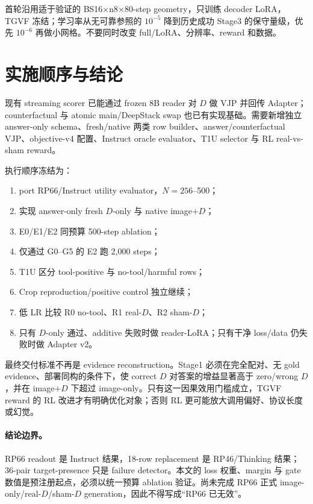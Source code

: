 \documentclass[UTF8,twocolumn,10pt,a4paper]{ctexart}
\begin{document}
首轮沿用适于验证的 BS16$\times$n8$\times$80-step geometry，只训练 decoder LoRA，TGVF 冻结；学习率从无可靠参照的 $10^{-5}$ 降到历史成功 Stage3 的保守量级，优先 $10^{-6}$ 再做小网格。不要同时改变 full/LoRA、分辨率、reward 和数据。

\section{实施顺序与结论}

现有 streaming scorer 已能通过 frozen 8B reader 对 $D$ 做 VJP 并回传 Adapter；counterfactual 与 atomic main/DeepStack swap 也已有实现基础。需要新增独立 answer-only schema、fresh/native 两类 row builder、answer/counterfactual VJP、objective-v4 配置、Instruct oracle evaluator、T1U selector 与 RL real-vs-sham reward。

执行顺序冻结为：
\begin{enumerate}
  \item port RP66/Instruct utility evaluator，$N=256$--500；
  \item 实现 answer-only fresh $D$-only 与 native image+$D$；
  \item E0/E1/E2 同预算 500-step ablation；
  \item 仅通过 G0--G5 的 E2 跑 2,000 steps；
  \item T1U 区分 tool-positive 与 no-tool/harmful rows；
  \item Crop reproduction/positive control 独立继续；
  \item 低 LR 比较 R0 no-tool、R1 real-$D$、R2 sham-$D$；
  \item 只有 $D$-only 通过、additive 失败时做 reader-LoRA；只有干净 loss/data 仍失败时做 Adapter v2。
\end{enumerate}

最终交付标准不再是 evidence reconstruction。Stage1 必须在完全配对、无 gold evidence、部署同构的条件下，使 correct $D$ 对答案的增益显著高于 zero/wrong $D$，并在 image+$D$ 下超过 image-only。只有这一因果效用门槛成立，TGVF reward 的 RL 改进才有明确优化对象；否则 RL 更可能放大调用偏好、协议长度或幻觉。

\paragraph{结论边界。}
RP66 readout 是 Instruct 结果，18-row replacement 是 RP46/Thinking 结果；36-pair target-presence 只是 failure detector。本文的 loss 权重、margin 与 gate 数值是预注册起点，必须以统一预算 ablation 验证。尚未完成 RP66 正式 image-only/real-$D$/sham-$D$ generation，因此不得写成“RP66 已无效”。
\end{document}
